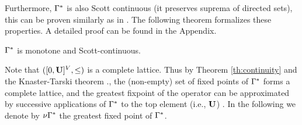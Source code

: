 Furthermore, $\Gamma^*$ is also Scott continuous (it preserves suprema of directed sets), this can be proven similarly as in \cite{DBLP:conf/memics/BrazdilKN12}. The following theorem 
formalizes these properties. A detailed proof can be found in the Appendix.
\begin{theorem}\label{th:continuity} $\Gamma^*$ is monotone and Scott-continuous.
\end{theorem}
Note that $([0,\mathbf{U}]^V, \leq)$ is a complete lattice. Thus by Theorem \ref{th:continuity} and the Knaster-Tarski theorem  \cite{davey1990introduction}., the (non-empty) set of fixed points of $\Gamma^*$ forms a complete lattice, and the greatest fixpoint of the operator can be approximated by successive  applications of $\Gamma^*$ to the top element (i.e., $\mathbf{U}$) \cite{davey1990introduction}. In the following we denote by $\nu \Gamma^*$ the greatest fixed point of $\Gamma^*$.

